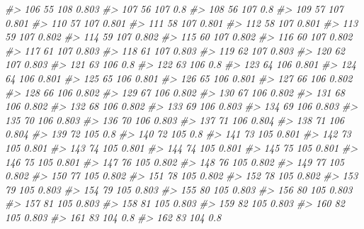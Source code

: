\documentclass[]{book}
\newenvironment{Shaded}{\begin{snugshade}}{\end{snugshade}}
\newcommand{\CommentTok}[1]{\textcolor[rgb]{0.56,0.35,0.01}{\textit{#1}}}
\begin{document}
\begin{Shaded}
\begin{Highlighting}[]
\CommentTok{#> 106         55      108 0.803}
\CommentTok{#> 107         56      107   0.8}
\CommentTok{#> 108         56      107   0.8}
\CommentTok{#> 109         57      107 0.801}
\CommentTok{#> 110         57      107 0.801}
\CommentTok{#> 111         58      107 0.801}
\CommentTok{#> 112         58      107 0.801}
\CommentTok{#> 113         59      107 0.802}
\CommentTok{#> 114         59      107 0.802}
\CommentTok{#> 115         60      107 0.802}
\CommentTok{#> 116         60      107 0.802}
\CommentTok{#> 117         61      107 0.803}
\CommentTok{#> 118         61      107 0.803}
\CommentTok{#> 119         62      107 0.803}
\CommentTok{#> 120         62      107 0.803}
\CommentTok{#> 121         63      106   0.8}
\CommentTok{#> 122         63      106   0.8}
\CommentTok{#> 123         64      106 0.801}
\CommentTok{#> 124         64      106 0.801}
\CommentTok{#> 125         65      106 0.801}
\CommentTok{#> 126         65      106 0.801}
\CommentTok{#> 127         66      106 0.802}
\CommentTok{#> 128         66      106 0.802}
\CommentTok{#> 129         67      106 0.802}
\CommentTok{#> 130         67      106 0.802}
\CommentTok{#> 131         68      106 0.802}
\CommentTok{#> 132         68      106 0.802}
\CommentTok{#> 133         69      106 0.803}
\CommentTok{#> 134         69      106 0.803}
\CommentTok{#> 135         70      106 0.803}
\CommentTok{#> 136         70      106 0.803}
\CommentTok{#> 137         71      106 0.804}
\CommentTok{#> 138         71      106 0.804}
\CommentTok{#> 139         72      105   0.8}
\CommentTok{#> 140         72      105   0.8}
\CommentTok{#> 141         73      105 0.801}
\CommentTok{#> 142         73      105 0.801}
\CommentTok{#> 143         74      105 0.801}
\CommentTok{#> 144         74      105 0.801}
\CommentTok{#> 145         75      105 0.801}
\CommentTok{#> 146         75      105 0.801}
\CommentTok{#> 147         76      105 0.802}
\CommentTok{#> 148         76      105 0.802}
\CommentTok{#> 149         77      105 0.802}
\CommentTok{#> 150         77      105 0.802}
\CommentTok{#> 151         78      105 0.802}
\CommentTok{#> 152         78      105 0.802}
\CommentTok{#> 153         79      105 0.803}
\CommentTok{#> 154         79      105 0.803}
\CommentTok{#> 155         80      105 0.803}
\CommentTok{#> 156         80      105 0.803}
\CommentTok{#> 157         81      105 0.803}
\CommentTok{#> 158         81      105 0.803}
\CommentTok{#> 159         82      105 0.803}
\CommentTok{#> 160         82      105 0.803}
\CommentTok{#> 161         83      104   0.8}
\CommentTok{#> 162         83      104   0.8}

\end{Highlighting}
\end{Shaded}
\end{document}
